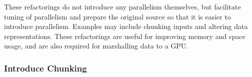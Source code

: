 \documentclass[final]{jfp1}
\begin{document}
These refactorings do not introduce any
parallelism themselves, but facilitate tuning of parallelism and prepare the original source so that it is easier
to introduce parallelism. Examples may include chunking inputs and
altering data representations. These refactorings are useful
for improving memory and space usage, and are also required for marshalling data to a GPU.

\subsubsection{Introduce Chunking}
\label{sec:introChunking}
\end{document}
